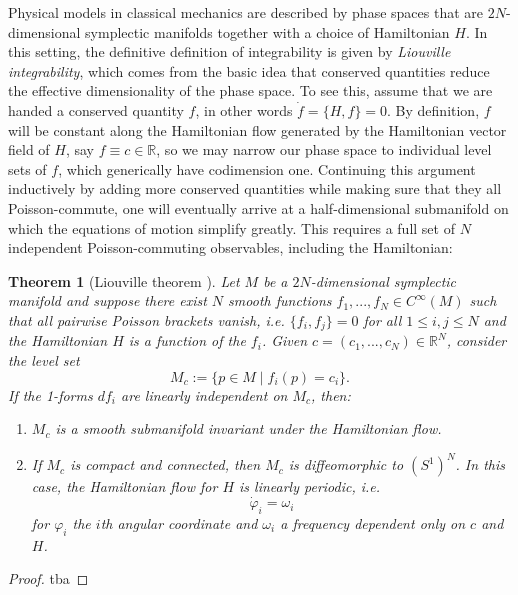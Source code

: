 \documentclass[11pt]{report}
\newtheorem{theorem}{Theorem}[section]
\theoremstyle{definition}
\theoremstyle{remark}
\theoremstyle{remark}
\newcommand{\R}{\mathbb{R}}
\begin{document}
Physical models in classical mechanics are described by phase spaces that are $2N$-dimensional symplectic manifolds together with a choice of Hamiltonian $H$. In this setting, the definitive definition of integrability is given by \emph{Liouville integrability}, which comes from the basic idea that conserved quantities reduce the effective dimensionality of the phase space. To see this, assume that we are handed a conserved quantity $f$, in other words $\dot f = \{ H, f \} = 0$. By definition, $f$ will be constant along the Hamiltonian flow generated by the Hamiltonian vector field of $H$, say $f \equiv c \in \R$, so we may narrow our phase space to individual level sets of $f$, which generically have codimension one. Continuing this argument inductively by adding more conserved quantities while making sure that they all Poisson-commute, one will eventually arrive at a half-dimensional submanifold on which the equations of motion simplify greatly. This requires a full set of $N$ independent Poisson-commuting observables, including the Hamiltonian:

\begin{theorem}[Liouville theorem \cite{book:arnold}] 
Let $M$ be a $2N$-dimensional symplectic manifold and suppose there exist $N$ smooth functions $f_1,...,f_N \in C^\infty(M)$ such that all pairwise Poisson brackets vanish, \emph{i.e.} $\{ f_i,f_j \} = 0$ for all $1 \leq i,j \leq N$ and the Hamiltonian $H$ is a function of the $f_i$. Given $c = (c_1,...,c_N) \in \R^N$, consider the level set
\begin{equation*}
M_c := \{ p \in M \mid f_i(p) = c_i \}.
\end{equation*}
If the 1-forms $df_i$ are linearly independent on $M_c$, then:
\begin{enumerate}[label=(\roman*)]
\item $M_c$ is a smooth submanifold invariant under the Hamiltonian flow.
\item If $M_c$ is compact and connected, then $M_c$ is diffeomorphic to $(S^1)^N$. In this case, the Hamiltonian flow for $H$ is linearly periodic, \emph{i.e.}
\begin{equation*}
\dot \varphi_i = \omega_i
\end{equation*}
for $\varphi_i$ the $i$th angular coordinate and $\omega_i$ a frequency dependent only on $c$ and $H$.
\end{enumerate}
\end{theorem}

\begin{proof}
tba
\end{proof}
\end{document}
